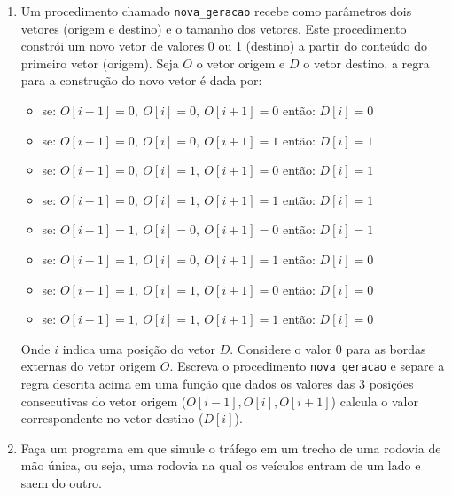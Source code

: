\begin{enumerate}
\item Um procedimento chamado \texttt{nova\_geracao} 
recebe como parâmetros dois  vetores (origem e  destino) e o
tamanho  dos vetores.  Este  procedimento constrói  um  novo vetor  de
valores  0 ou  1  (destino) a  partir  do conteúdo  do primeiro  vetor
(origem). Seja $O$ o vetor origem e $D$ o vetor destino, a regra para 
a construção do novo vetor é dada por:
\begin{itemize}
\item 
se: $O[i-1] = 0,\ O[i] = 0,\ O[i+1] = 0$ então: $D[i] = 0$
\item 
se: $O[i-1] = 0,\ O[i] = 0,\ O[i+1] = 1$ então: $D[i] = 1$
\item 
se: $O[i-1] = 0,\ O[i] = 1,\ O[i+1] = 0$ então: $D[i] = 1$
\item 
se: $O[i-1] = 0,\ O[i] = 1,\ O[i+1] = 1$ então: $D[i] = 1$
\item 
se: $O[i-1] = 1,\ O[i] = 0,\ O[i+1] = 0$ então: $D[i] = 1$
\item 
se: $O[i-1] = 1,\ O[i] = 0,\ O[i+1] = 1$ então: $D[i] = 0$
\item 
se: $O[i-1] = 1,\ O[i] = 1,\ O[i+1] = 0$ então: $D[i] = 0$
\item 
se: $O[i-1] = 1,\ O[i] = 1,\ O[i+1] = 1$ então: $D[i] = 0$
\end{itemize}
Onde $i$ indica uma posição do vetor $D$. Considere o valor 0 para as
bordas externas do vetor origem $O$. Escreva o procedimento
\texttt{nova\_geracao} e separe a regra descrita acima em uma função
que dados os valores das 3 posições consecutivas do vetor origem
($O[i-1], O[i], O[i+1]$) calcula o valor correspondente no vetor
destino ($D[i]$).

\item Faça um programa em  que simule o 
tráfego em um trecho de uma rodovia de mão única, ou seja, uma rodovia na 
qual os veículos entram de um lado e saem do outro. 


\end{enumerate}
